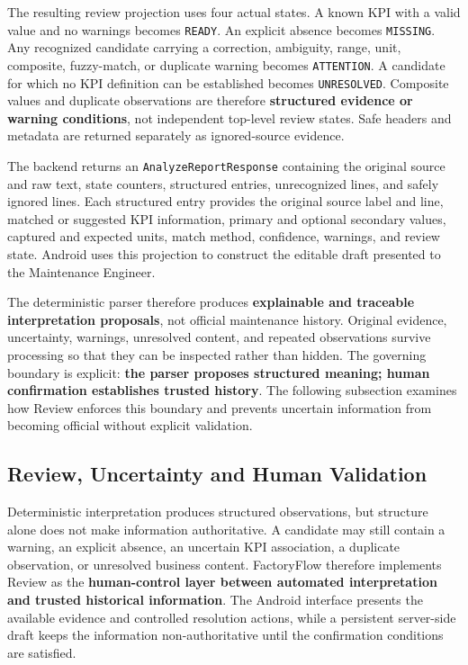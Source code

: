 The resulting review projection uses four actual states. A known KPI with a valid value and no warnings becomes \texttt{READY}. An explicit absence becomes \texttt{MISSING}. Any recognized candidate carrying a correction, ambiguity, range, unit, composite, fuzzy-match, or duplicate warning becomes \texttt{ATTENTION}. A candidate for which no KPI definition can be established becomes \texttt{UNRESOLVED}. Composite values and duplicate observations are therefore \textbf{structured evidence or warning conditions}, not independent top-level review states. Safe headers and metadata are returned separately as ignored-source evidence.

The backend returns an \texttt{AnalyzeReportResponse} containing the original source and raw text, state counters, structured entries, unrecognized lines, and safely ignored lines. Each structured entry provides the original source label and line, matched or suggested KPI information, primary and optional secondary values, captured and expected units, match method, confidence, warnings, and review state. Android uses this projection to construct the editable draft presented to the Maintenance Engineer.

The deterministic parser therefore produces \textbf{explainable and traceable interpretation proposals}, not official maintenance history. Original evidence, uncertainty, warnings, unresolved content, and repeated observations survive processing so that they can be inspected rather than hidden. The governing boundary is explicit: \textbf{the parser proposes structured meaning; human confirmation establishes trusted history}. The following subsection examines how Review enforces this boundary and prevents uncertain information from becoming official without explicit validation.

\subsection{Review, Uncertainty and Human Validation}
\label{subsec:review-human-validation}

Deterministic interpretation produces structured observations, but structure alone does not make information authoritative. A candidate may still contain a warning, an explicit absence, an uncertain KPI association, a duplicate observation, or unresolved business content. FactoryFlow therefore implements Review as the \textbf{human-control layer between automated interpretation and trusted historical information}. The Android interface presents the available evidence and controlled resolution actions, while a persistent server-side draft keeps the information non-authoritative until the confirmation conditions are satisfied.

